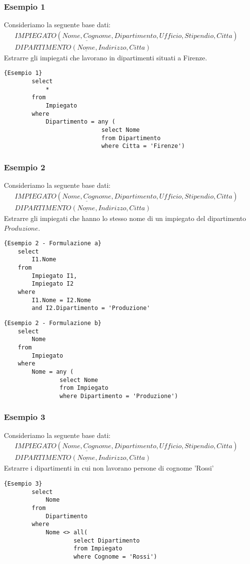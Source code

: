\subsubsection{Esempio 1}
Consideriamo la seguente base dati:
	\begin{equation}\begin{aligned}
		IMPIEGATO (\underline{Nome, Cognome}, Dipartimento, Ufficio, Stipendio, Citta)\\
		DIPARTIMENTO (\underline{Nome}, Indirizzo, Citta)
	\end{aligned}\end{equation}
Estrarre gli impiegati che lavorano in dipartimenti situati a Firenze.
	\begin{lstlisting}{Esempio 1}
		select
			*
		from
			Impiegato
		where
			Dipartimento = any (
							select Nome
							from Dipartimento
							where Citta = 'Firenze')
	\end{lstlisting}

\subsubsection{Esempio 2}
Consideriamo la seguente base dati:
	\begin{equation}\begin{aligned}
		IMPIEGATO (\underline{Nome, Cognome}, Dipartimento, Ufficio, Stipendio, Citta)\\
		DIPARTIMENTO (\underline{Nome}, Indirizzo, Citta)
	\end{aligned}\end{equation}
Estrarre gli impiegati che hanno lo stesso nome di un impiegato del dipartimento $Produzione$.
\begin{lstlisting}{Esempio 2 - Formulazione a}
	select
		I1.Nome
	from
		Impiegato I1, 
		Impiegato I2
	where
		I1.Nome = I2.Nome
		and I2.Dipartimento = 'Produzione'
\end{lstlisting}
\begin{lstlisting}{Esempio 2 - Formulazione b}
	select 
		Nome
	from 
		Impiegato
	where 
		Nome = any (
				select Nome
				from Impiegato
				where Dipartimento = 'Produzione')
\end{lstlisting}

\subsubsection{Esempio 3}
Consideriamo la seguente base dati:
	\begin{equation}\begin{aligned}
		IMPIEGATO (\underline{Nome, Cognome}, Dipartimento, Ufficio, Stipendio, Citta)\\
		DIPARTIMENTO (\underline{Nome}, Indirizzo, Citta)
	\end{aligned}\end{equation}
Estrarre i dipartimenti in cui non lavorano persone di cognome 'Rossi'
	\begin{lstlisting}{Esempio 3}
		select 
			Nome
		from
			Dipartimento
		where
			Nome <> all(
					select Dipartimento
					from Impiegato
					where Cognome = 'Rossi')
	\end{lstlisting}

